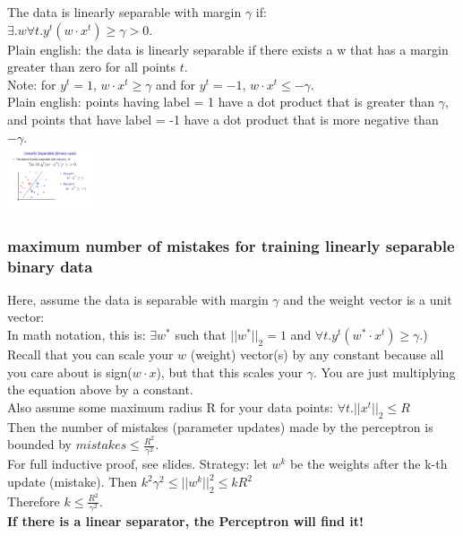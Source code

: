  The data is linearly separable with margin $\gamma$ if:   \hfill \\
$\exists .w \forall t . y^t (w \cdot x^t) \geq \gamma > 0$.  \hfill \\
Plain english: the data is linearly separable if there exists a w that has a margin greater than zero for all points $t$.  \hfill \\
Note: for $y^t = 1$, $w \cdot x^t \geq \gamma$ and for $y^t = -1$, $w \cdot x^t \leq -\gamma$.  \hfill \\
Plain english: points having label = 1 have a dot product that is greater than $\gamma$, and points that have label = -1 have a dot product that is more negative than $-\gamma$.  \hfill \\
 \includegraphics[width=1.0in]{figures/lin_sep_margin.pdf}
 
 \subsubsection{maximum number of mistakes for training linearly separable binary data}
Here, assume the data is separable with margin $\gamma$ and the weight vector is a unit vector: \hfill \\
In math notation, this is: $\exists w^*$ such that $||w^*||_2 = 1$ and $\forall t. y^t(w^* \cdot x^t) \geq \gamma$.) \hfill \\
Recall that you can scale your $w$ (weight) vector(s) by any constant because all you care about is sign($w \cdot x$),
but that this scales your $\gamma$.  You are just multiplying the equation above by a constant.  \hfill \\

Also assume some maximum radius R for your data points:  
$\forall t. ||x^t||_2 \leq R$ \hfill \\
Then the number of mistakes (parameter updates) made by the perceptron is bounded by 
$\displaystyle mistakes \leq \frac{R^2}{\gamma^2}$. \hfill \\
For full inductive proof, see slides.  
Strategy: let $w^k$ be the weights after the k-th update (mistake).  
Then $k^2 \gamma^2 \leq ||w^k||_2^2 \leq k R^2$ \hfill \\
Therefore $k \leq \frac{R^2}{\gamma^2}$.  \hfill \\
\textbf{If there is a linear separator, the Perceptron will find it!} \hfill \\
 \hfill \\
 
